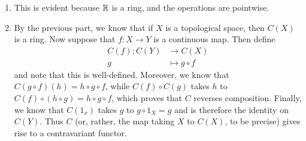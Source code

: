\documentclass[../../solutions.tex]{subfiles}
\begin{document}
\begin{exercise} \leavevmode
\begin{enumerate}
\item This is evident because $\mathbb{R}$ is a ring, and the operations are pointwise. 

\item By the previous part, we know that if $X$ is a topological space, then $C(X)$ is a ring. Now suppose that $f:X\to Y$ is a continuous map. Then define \begin{align*}C(f):C(Y)&\to C(X)\\g&\mapsto g\circ f\end{align*} and note that this is well-defined. Moreover, we know that $C(g\circ f)(h)=h\circ g\circ f$, while $C(f)\circ C(g)$ takes $h$ to $C(f)\circ(h\circ g)=h\circ g\circ f$, which proves that $C$ reverses composition. Finally, we know that $C(1_x)$ takes $g$ to $g\circ 1_X=g$ and is therefore the identity on $C(Y)$. Thus $C$ (or, rather, the map taking $X$ to $C(X)$, to be precise) gives rise to a contravariant functor. 
\end{enumerate}
\end{exercise} 
\end{document}
